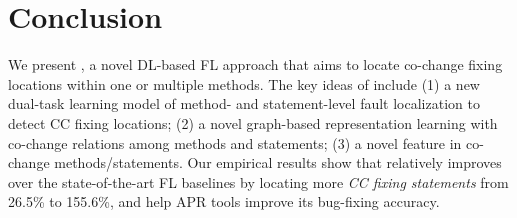 \section{Conclusion}

We present {\tool}, a novel DL-based FL approach that aims to locate
co-change fixing locations within one or multiple methods. The key
ideas of {\tool} include (1) a new dual-task learning model of method-
and statement-level fault localization to detect CC fixing locations;
(2) a novel graph-based representation learning with co-change
relations among methods and statements; (3) a novel feature in co-change
methods/statements. Our empirical results show that
%
{\tool} relatively improves over the state-of-the-art
FL baselines by locating more {\em CC fixing statements} from 26.5\% to
155.6\%, and help APR tools improve its bug-fixing accuracy.

\vspace{2pt}




